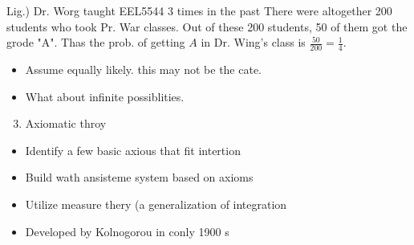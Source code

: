 Lig.) Dr. Worg taught EEL5544 3 times in the past There were altogether 200 students who took Pr. War classes. Out of these 200 students, 50 of them got the grode "A". Thas the prob. of getting \(A\) in Dr. Wing's class is \(\frac{50}{200}=\frac{1}{4}\).

\begin{itemize}
  \item[-] Assume equally likely. this may not be the cate.
  \item[-] What about infinite possiblities.
\end{itemize}

\begin{enumerate}
  \setcounter{enumi}{2}
  \item Axiomatic throy
\end{enumerate}

\begin{itemize}
  \item[-] Identify a few basic axious that fit intertion
  \item[-] Build wath ansisteme system based on axioms
  \item[-] Utilize measure thery (a generalization of integration
  \item[-] Developed by Kolnogorou in conly 1900 s
\end{itemize}

